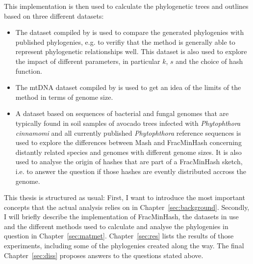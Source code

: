 This implementation is then used to calculate the phylogenetic trees and
outlines based on three different datasets:

\begin{itemize}
  \item The dataset compiled by 
  is used to compare the generated phylogenies with published phylogenies, e.g.
  \cite{mandalComparativeGenomeAnalysis2022,yangExpandedPhylogenyGenus2017,abadPhytophthoraTaxonomicPhylogenetic2023a}
  to verifiy that the method is generally able to represent phylogenetic
  relationships well. This dataset is also used to explore the impact of
  different parameters, in particular $k$, $s$ and the choice of hash function.
  \item The mtDNA dataset compiled by
   is used to get an idea
  of the limits of the method in terms of genome size.
  \item A dataset based on sequences of bacterial and fungal genomes that are
  typically found in soil samples of avocado trees infected with
  \textit{Phytophthora cinnamomi} \cite{solis-garciaPhytophthoraRootRot2020} and
  all currently published \textit{Phytophthora} reference sequences is used to
  explore the differences between Mash and FracMinHash concerning distantly
  related species and genomes with different genome sizes. It is also used to
  analyse the origin of hashes that are part of a FracMinHash sketch, i.e. to
  answer the question if those hashes are evently distributed accross the
  genome.
\end{itemize}

This thesis is structured as usual: First, I want to introduce the most
important concepts that the actual analysis relies on in
Chapter~\ref{sec:background}. Secondly, I will briefly describe the
implementation of FracMinHash, the datasets in use and the different methods
used to calculate and analyse the phylogenies in question in
Chapter~\ref{sec:matmet}. Chapter~\ref{sec:res} lists the results of those
experiments, including some of the phylogenies created along the way. The final
Chapter~\ref{sec:diss} proposes answers to the questions stated above. 